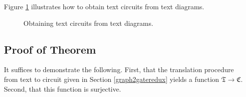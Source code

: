 \begin{example}
Figure \ref{fig:comic2} illustrates how to obtain text circuits from text diagrams.

\begin{figure}[!]
    \centering
    \caption{Obtaining text circuits from text diagrams.} 
    \label{fig:comic2}
\end{figure}
\end{example}

\subsection{Proof of Theorem}

It suffices to demonstrate the following. First, that the translation procedure from text to circuit given in Section \ref{graph2gateredux} yields a function $\mathfrak{T} \rightarrow \mathfrak{C}$. Second, that this function is surjective.

